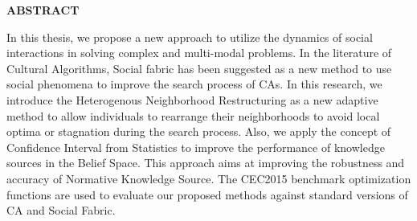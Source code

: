 \documentclass[12pt]{article}
\begin{document}
\begin{center}
	\textbf{ABSTRACT}
\end{center}
In this thesis, we propose a new approach to utilize the dynamics of social interactions in solving complex and multi-modal problems. In the literature of Cultural Algorithms, Social fabric has been suggested as a new method to use social phenomena to improve the search process of CAs. In this research, we introduce the Heterogenous Neighborhood Restructuring as a new adaptive method to allow individuals to rearrange their neighborhoods to avoid local optima or stagnation during the search process.\newline
Also, we apply the concept of Confidence Interval from Statistics to improve the performance of knowledge sources in the Belief Space. This approach aims at improving the robustness and accuracy of Normative Knowledge Source. The CEC2015 benchmark optimization functions are used to evaluate our proposed methods against standard versions of CA and Social Fabric.
\end{document}
